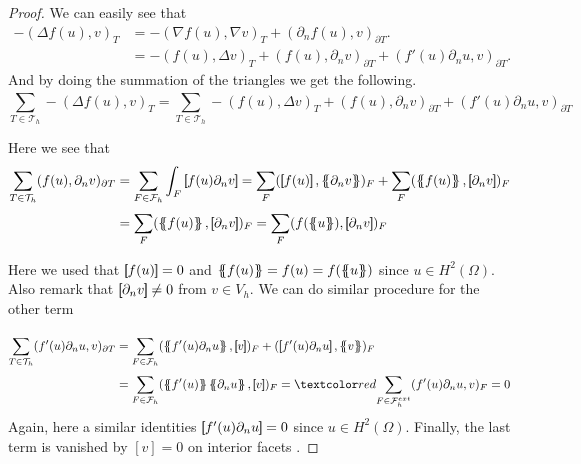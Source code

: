 \begin{proof}
  We can easily see that \[
    \begin{split}
-(\Delta f( u) , v)_{T } &= -(\nabla f( u), \nabla v  )_{T } + ( \partial _{n}  f( u), v )_{\partial T }.\\
                    & = -( f( u), \Delta v )_{T} + (f( u), \partial _{n} v  )_{\partial T} + (   f'( u)\partial _{n}u, v )_{\partial T } .
    \end{split}
\]
And by doing the summation of the triangles we get the following.
\[
\sum_{T \in  \mathcal{T} _{h} }^{} -(\Delta f( u) , v)_{T } = \sum_{T \in \mathcal{T} _{h}}^{}  -( f( u), \Delta v )_{T} + (f( u), \partial _{n} v  )_{\partial T} + (   f'( u)\partial _{n}u, v )_{\partial T }
\]

Here we see that \[
    \begin{split}
\sum_{T \in \mathcal{T}_{h} }^{} ( f( u) , \partial _{n}v)_{\partial T} & =  \sum_{F \in \mathcal{F}_{h} }^{} \int_{F}^{}  \jump{    f( u) \partial _{n}v}  = \sum_{F}^{} ( \jump{f( u)} , \mean{ \partial _{n}v }  )_{F} + \sum_{F}^{} ( \mean{f( u)}
, \jump{ \partial _{n}v }  )_{F} \\
 & =   \sum_{F}^{} ( \mean{f( u)} , \jump{ \partial _{n}v }  )_{F} = \sum_{F}^{} ( f(\mean{ u}) , \jump{ \partial _{n}v }  )_{F}
    \end{split}
\]

Here we used that $ \left[\!\!\left[  f( u)   \right]\!\!\right] = 0  $ and $\mean{ f( u)  } = f( u) = f( \mean{ u }  )    $  since $u \in H^2( \Omega ) $. Also remark that $\left[\!\!\left[  \partial _{n}v  \right]\!\!\right] \neq 0   $ from $v \in V_{h}$. We can do similar procedure for the other term

\[
    \begin{split}
\sum_{T \in \mathcal{T} _{h}}^{} (   f'( u)\partial _{n}u, v )_{\partial T } & = \sum_{F \in \mathcal{F} _{h}}^{} (\mean{ f'( u)\partial _{n}u }  , \jump{ v }   )_{F} +  (\jump{ f'( u)\partial _{n}u }  , \mean{ v }   )_{F} \\
                                                                             & = \sum_{F \in \mathcal{F} _{h}}^{} (\mean{ f'( u)} \mean{ \partial _{n}u }  , \jump{ v }   )_{F} = \red{\sum_{F \in \mathcal{F} _{h}^{ext}}^{} ( f'( u)  \partial _{n}u   ,  v
                                                                             )_{F} = 0} \\
    \end{split}
\]
Again, here a similar identities $\left[\!\!\left[   f' ( u) \partial _{n} u \right]\!\!\right] = 0  $ since $u \in H^2( \Omega ) $. Finally, the last term is vanished by $\left[ v \right] = 0 $ on interior facets .

\end{proof}


